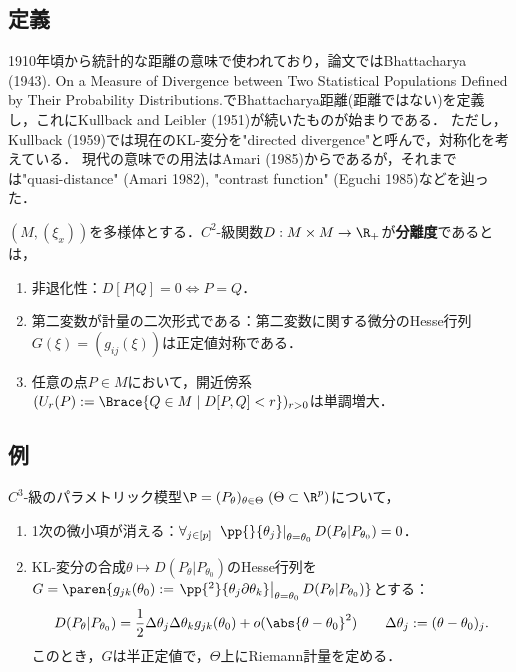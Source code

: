 \documentclass[uplatex,dvipdfmx]{jsreport}
\begin{document}
\subsection{定義}

\begin{history}
    1910年頃から統計的な距離の意味で使われており，論文ではBhattacharya (1943). On a Measure of Divergence between Two Statistical Populations Defined by Their Probability Distributions.でBhattacharya距離(距離ではない)を定義し，これにKullback and Leibler (1951)が続いたものが始まりである．
    ただし，Kullback (1959)では現在のKL-変分を"directed divergence"と呼んで，対称化を考えている．
    現代の意味での用法はAmari (1985)からであるが，それまでは"quasi-distance" (Amari 1982), "contrast function" (Eguchi 1985)などを辿った．
\end{history}


\begin{definition}[divergence]
    $(M,(\xi_x))$を多様体とする．$C^2$-級関数$D:M\times M\to\R_+$が\textbf{分離度}であるとは，
    \begin{enumerate}
        \item 非退化性：$D[P|Q]=0\Leftrightarrow P=Q$．
        \item 第二変数が計量の二次形式である：第二変数に関する微分のHesse行列$G(\xi)=(g_{ij}(\xi))$は正定値対称である．
        \item 任意の点$P\in M$において，開近傍系$(U_r(P):=\Brace{Q\in M\mid D[P,Q]<r})_{r>0}$は単調増大．
    \end{enumerate}
\end{definition}


\subsection{例}

\begin{definition}[$f$-divergence]
    
\end{definition}

\begin{theorem}[Fisher計量]
    $C^3$-級のパラメトリック模型$\P=(P_\theta)_{\theta\in\Theta}\;(\Theta\subset\R^p)$について，
    \begin{enumerate}
        \item 1次の微小項が消える：$\forall_{j\in[p]}\;\left.\pp{}{\theta_j}\right|_{\theta=\theta_0}D(P_\theta|P_{\theta_0})=0$．
        \item KL-変分の合成$\theta\mapsto D(P_\theta|P_{\theta_0})$のHesse行列を$G=\paren{g_{jk}(\theta_0):=\left.\pp{^2}{\theta_j\partial\theta_k}\right|_{\theta=\theta_0}D(P_\theta|P_{\theta_0})}$とする：
        \[D(P_\theta|P_{\theta_0})=\frac{1}{2}\Delta\theta_j\Delta\theta_kg_{jk}(\theta_0)+o(\abs{\theta-\theta_0}^2)\qquad\Delta\theta_j:=(\theta-\theta_0)_j.\]
        このとき，$G$は半正定値で，$\Theta$上にRiemann計量を定める．
    \end{enumerate}
\end{theorem}
\end{document}
